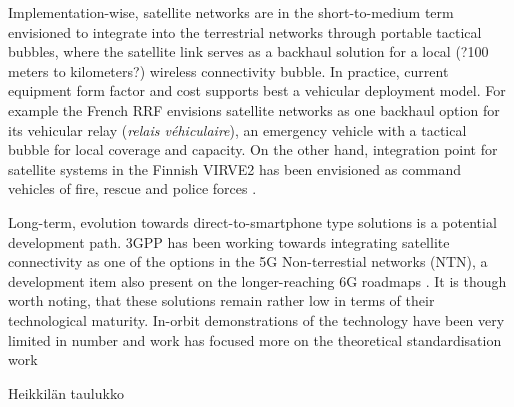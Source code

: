 \documentclass[english, 12pt, a4paper, elec, utf8, a-1b, online]{aaltothesis}
\begin{document}
Implementation-wise, satellite networks are in the short-to-medium term envisioned to integrate into the terrestrial networks through portable tactical bubbles, where the satellite link serves as a backhaul solution for a local (?100 meters to kilometers?) wireless connectivity bubble. In practice, current equipment form factor and cost supports best a vehicular deployment model. For example the French RRF envisions satellite networks as one backhaul option for its vehicular relay (\textit{relais véhiculaire}), an emergency vehicle with a tactical bubble for local coverage and capacity. On the other hand, integration point for satellite systems in the Finnish VIRVE2 has been envisioned as command vehicles of fire, rescue and police forces \cite{RRF_VIITE,saynevirta2021satellite}.

Long-term, evolution towards direct-to-smartphone type solutions is a potential development path. 3GPP has been working towards integrating satellite connectivity as one of the options in the 5G Non-terrestial networks (NTN), a development item also present on the longer-reaching 6G roadmaps \cite{6G_ROADMAP, 3GPP_NTN_PAPERS}. It is though worth noting, that these solutions remain rather low in terms of their technological maturity. In-orbit demonstrations of the technology have been very limited in number and work has focused more on the theoretical standardisation work %

Heikkilän taulukko
\end{document}
